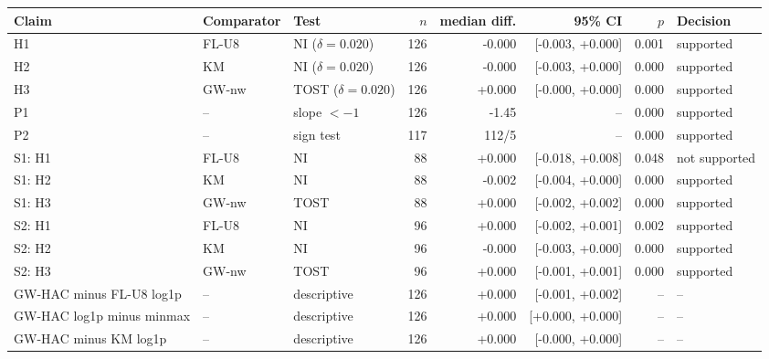 \begin{tabular}{lllrrrrl}
\toprule
Claim & Comparator & Test & $n$ & median diff. & 95\% CI & $p$ & Decision\\
\midrule
H1 & FL-U8 & NI ($\delta=0.020$) & 126 & -0.000 & [-0.003, +0.000] & 0.001 & supported\\
H2 & KM & NI ($\delta=0.020$) & 126 & -0.000 & [-0.003, +0.000] & 0.000 & supported\\
H3 & GW-nw & TOST ($\delta=0.020$) & 126 & +0.000 & [-0.000, +0.000] & 0.000 & supported\\
P1 & -- & slope $<-1$ & 126 & -1.45 & -- & 0.000 & supported\\
P2 & -- & sign test & 117 & 112/5 & -- & 0.000 & supported\\
S1: H1 & FL-U8 & NI & 88 & +0.000 & [-0.018, +0.008] & 0.048 & not supported\\
S1: H2 & KM & NI & 88 & -0.002 & [-0.004, +0.000] & 0.000 & supported\\
S1: H3 & GW-nw & TOST & 88 & +0.000 & [-0.002, +0.002] & 0.000 & supported\\
S2: H1 & FL-U8 & NI & 96 & +0.000 & [-0.002, +0.001] & 0.002 & supported\\
S2: H2 & KM & NI & 96 & -0.000 & [-0.003, +0.000] & 0.000 & supported\\
S2: H3 & GW-nw & TOST & 96 & +0.000 & [-0.001, +0.001] & 0.000 & supported\\
GW-HAC minus FL-U8 log1p & -- & descriptive & 126 & +0.000 & [-0.001, +0.002] & -- & --\\
GW-HAC log1p minus minmax & -- & descriptive & 126 & +0.000 & [+0.000, +0.000] & -- & --\\
GW-HAC minus KM log1p & -- & descriptive & 126 & +0.000 & [-0.000, +0.000] & -- & --\\
\bottomrule
\end{tabular}
